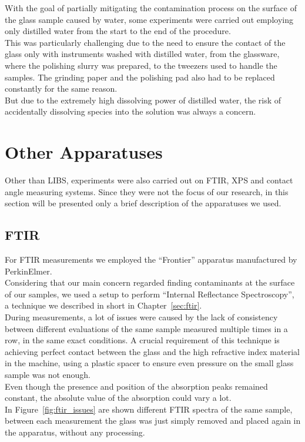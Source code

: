 With the goal of partially mitigating the contamination process on the surface of the glass sample caused by water, some experiments were carried out employing only distilled water from the start to the end of the procedure.
\\
This was particularly challenging due to the need to ensure the contact of the glass only with instruments washed with distilled water, from the glassware, where the polishing slurry was prepared, to the tweezers used to handle the samples. The grinding paper and the polishing pad also had to be replaced constantly for the same reason.
\\
But due to the extremely high dissolving power of distilled water, the risk of accidentally dissolving species into the solution was always a concern.

\section{Other Apparatuses}
\label{sec:other_apparatuses}
Other than LIBS, experiments were also carried out on FTIR, XPS and contact angle measuring systems. Since they were not the focus of our research, in this section will be presented only a brief description of the apparatuses we used.

\subsection{FTIR}
\label{subsec:ftir_setup}
For FTIR measurements we employed the “Frontier” apparatus manufactured by PerkinElmer.
\\
Considering that our main concern regarded finding contaminants at the surface of our samples, we used a setup to perform “Internal Reflectance Spectroscopy”, a technique we described in short in Chapter~\ref{sec:ftir}.
\\
During measurements, a lot of issues were caused by the lack of consistency between different evaluations of the same sample measured multiple times in a row, in the same exact conditions. A crucial requirement of this technique is achieving perfect contact between the glass and the high refractive index material in the machine, using a plastic spacer to ensure even pressure on the small glass sample was not enough.
\\
Even though the presence and position of the absorption peaks remained constant, the absolute value of the absorption could vary a lot.
\\
In Figure~\ref{fig:ftir_issues} are shown different FTIR spectra of the same sample, between each measurement the glass was just simply removed and placed again in the apparatus, without any processing.

